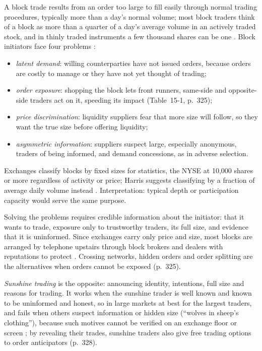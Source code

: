 \begin{qfdefinition}\label{def:block-trade}
 A block trade results from an order too large to fill easily through normal trading procedures, typically more than a day's normal volume; most block traders think of a block as more than a quarter of a day's average volume in an actively traded stock, and in thinly traded instruments a few thousand shares can be one \citep[chap.~``Block Traders'', sec.~15.1, p.~322]{alpha-harris}. Block initiators face four problems \citep[same chap., sec.~15.2, pp.~323--327]{alpha-harris}:
\begin{itemize}
\item \emph{latent demand}: willing counterparties have not issued orders, because orders are costly to manage or they have not yet thought of trading;
\item \emph{order exposure}: shopping the block lets front runners, same-side and opposite-side traders act on it, speeding its impact (Table~15-1, p.~325);
\item \emph{price discrimination}: liquidity suppliers fear that more size will follow, so they want the true size before offering liquidity;
\item \emph{asymmetric information}: suppliers suspect large, especially anonymous, traders of being informed, and demand concessions, as in adverse selection.
\end{itemize}

 Exchanges classify blocks by fixed sizes for statistics, the NYSE at 10{,}000 shares or more regardless of activity or price; Harris suggests classifying by a fraction of average daily volume instead \citep[same chap., sec.~15.1 and box, p.~323]{alpha-harris}. Interpretation: typical depth or participation capacity would serve the same purpose.

 Solving the problems requires credible information about the initiator: that it wants to trade, exposure only to trustworthy traders, its full size, and evidence that it is uninformed. Since exchanges carry only price and size, most blocks are arranged by telephone upstairs through block brokers and dealers with reputations to protect \citep[same chap., secs.~15.2.2--15.2.5, pp.~324--327]{alpha-harris}. Crossing networks, hidden orders and order splitting are the alternatives when orders cannot be exposed (p.~325).

\emph{Sunshine trading} is the opposite: announcing identity, intentions, full size and reasons for trading. It works when the sunshine trader is well known and known to be uninformed and honest, so in large markets at best for the largest traders, and fails when others suspect information or hidden size (``wolves in sheep's clothing''), because such motives cannot be verified on an exchange floor or screen \citep[same chap., sec.~15.3, pp.~327--328]{alpha-harris}; by revealing their trades, sunshine traders also give free trading options to order anticipators (p.~328).


\end{qfdefinition}
